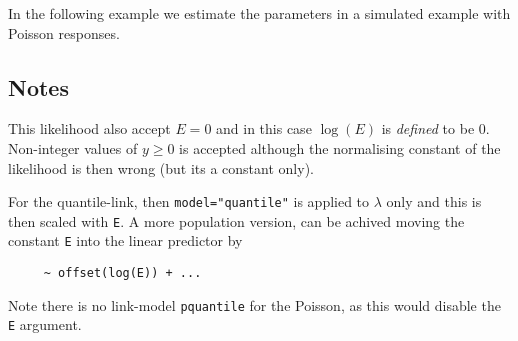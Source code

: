 \documentclass[a4paper,11pt]{article}
\begin{document}
In the following example we estimate the parameters in a simulated
example with Poisson responses.


\subsection*{Notes}

This likelihood also accept $E=0$ and in this case $\log(E)$ is
\emph{defined} to be $0$. Non-integer values of $y \ge 0$ is accepted
although the normalising constant of the likelihood is then wrong (but
its a constant only).

For the quantile-link, then \texttt{model="quantile"} is applied to
$\lambda$ only and this is then scaled with \texttt{E}. A more
population version, can be achived moving the constant \texttt{E} into
the linear predictor by 
\begin{verbatim}
     ~ offset(log(E)) + ...
\end{verbatim}
Note there is no link-model \texttt{pquantile} for the Poisson, as
this would disable the \texttt{E} argument.
\end{document}
